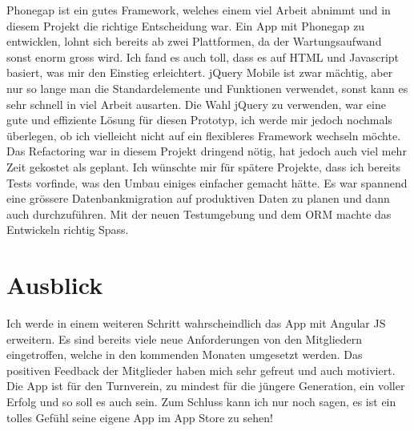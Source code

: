 Phonegap ist ein gutes Framework, welches einem viel Arbeit abnimmt und in diesem Projekt die richtige Entscheidung war. Ein App mit Phonegap zu entwicklen, lohnt sich bereits ab zwei Plattformen, da der Wartungsaufwand sonst enorm gross wird. Ich fand es auch toll, dass es auf HTML und Javascript basiert, was mir den Einstieg erleichtert. jQuery Mobile ist zwar mächtig, aber nur so lange man die Standardelemente und Funktionen verwendet, sonst kann es sehr schnell in viel Arbeit ausarten. Die Wahl jQuery zu verwenden, war eine gute und effiziente Lösung für diesen Prototyp, ich werde mir jedoch nochmals überlegen, ob ich vielleicht nicht auf ein flexibleres Framework wechseln möchte.\\

Das Refactoring war in diesem Projekt dringend nötig, hat jedoch auch viel mehr Zeit gekostet als geplant. Ich wünschte mir für spätere Projekte, dass ich bereits Tests vorfinde, was den Umbau einiges einfacher gemacht hätte. Es war spannend eine grössere Datenbankmigration auf produktiven Daten zu planen und dann auch durchzuführen. Mit der neuen Testumgebung und dem ORM machte das Entwickeln richtig Spass.\\

\section{Ausblick}\label{fazit_ausblick}
Ich werde in einem weiteren Schritt wahrscheindlich das App mit Angular JS erweitern. Es sind bereits viele neue Anforderungen von den Mitgliedern eingetroffen, welche in den kommenden Monaten umgesetzt werden. Das positiven Feedback der Mitglieder haben mich sehr gefreut und auch motiviert. Die App ist für den Turnverein, zu mindest für die jüngere Generation, ein voller Erfolg und so soll es auch sein. Zum Schluss kann ich nur noch sagen, es ist ein tolles Gefühl seine eigene App im App Store zu sehen!